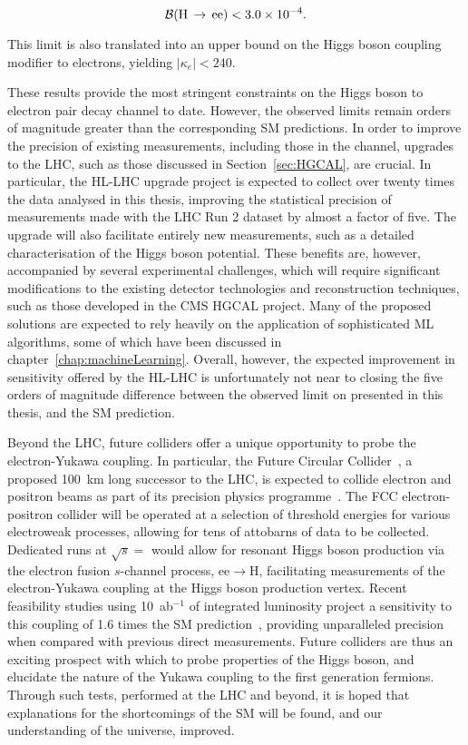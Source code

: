 \begin{equation*}
    \mathcal{B}(\mathrm{H}\,\rightarrow\,\mathrm{ee}) < 3.0\times10^{-4}.
\end{equation*}

\noindent This limit is also translated into an upper bound on the Higgs boson coupling modifier to electrons, yielding $|\kappa_{e}|<240$. 

These results provide the most stringent constraints on the Higgs boson to electron pair decay channel to date. However, the observed limits remain orders of magnitude greater than the corresponding SM predictions. In order to improve the precision of existing measurements, including those in the \Hee channel, upgrades to the LHC, such as those discussed in Section~\ref{sec:HGCAL}, are crucial. In particular, the HL-LHC upgrade project is expected to collect over twenty times the data analysed in this thesis, improving the statistical precision of measurements made with the LHC Run 2 dataset by almost a factor of five. The upgrade will also facilitate entirely new measurements, such as a detailed characterisation of the Higgs boson potential. These benefits are, however, accompanied by several experimental challenges, which will require significant modifications to the existing detector technologies and reconstruction techniques, such as those developed in the CMS HGCAL project. Many of the proposed solutions are expected to rely heavily on the application of sophisticated ML algorithms, some of which have been discussed in chapter~\ref{chap:machineLearning}. Overall, however, the expected improvement in sensitivity offered by the HL-LHC is unfortunately not near to closing the five orders of magnitude difference between the observed limit on \BHee presented in this thesis, and the SM prediction. 

Beyond the LHC, future colliders offer a unique opportunity to probe the electron-Yukawa coupling. In particular, the Future Circular Collider~\cite{FCC_OG}, a proposed 100~km long successor to the LHC, is expected to collide electron and positron beams as part of its precision physics programme~\cite{FCC_physics_prog}. The FCC electron-positron collider will be operated at a selection of threshold energies for various electroweak processes, allowing for tens of attobarns of data to be collected. Dedicated runs at $\sqrt{s}=$ \mH would allow for resonant Higgs boson production via the electron fusion $s$-channel process, $\mathrm{ee}\rightarrow \mathrm{H}$, facilitating measurements of the electron-Yukawa coupling at the Higgs boson production vertex. Recent feasibility studies using 10~ab$^{-1}$ of integrated luminosity project a sensitivity to this coupling of 1.6 times the SM prediction~\cite{FCC_eeH}, providing unparalleled precision when compared with previous direct measurements. Future colliders are thus an exciting prospect with which to probe properties of the Higgs boson, and elucidate the nature of the Yukawa coupling to the first generation fermions. Through such tests, performed at the LHC and beyond, it is hoped that explanations for the shortcomings of the SM will be found, and our understanding of the universe, improved.

